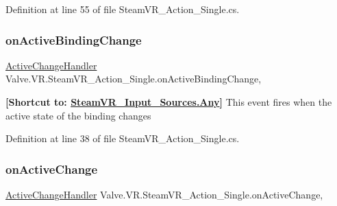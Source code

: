 Definition at line 55 of file Steam\+V\+R\+\_\+\+Action\+\_\+\+Single.\+cs.

\mbox{\label{class_valve_1_1_v_r_1_1_steam_v_r___action___single_ac2174a4a4cf474cb9141e6a6d9709f9c}} 
\subsubsection{\texorpdfstring{onActiveBindingChange}{onActiveBindingChange}}
{\footnotesize\ttfamily \mbox{\hyperlink{class_valve_1_1_v_r_1_1_steam_v_r___action___single_a45ad70dbb8a58191f373b7ae098b833b}{Active\+Change\+Handler}} Valve.\+V\+R.\+Steam\+V\+R\+\_\+\+Action\+\_\+\+Single.\+on\+Active\+Binding\+Change\hspace{0.3cm}{\ttfamily [add]}, {\ttfamily [remove]}}



{\bfseries{\mbox{[}Shortcut to\+: \mbox{\hyperlink{namespace_valve_1_1_v_r_a82e5bf501cc3aa155444ee3f0662853faed36a1ef76a59ee3f15180e0441188ad}{Steam\+V\+R\+\_\+\+Input\+\_\+\+Sources.\+Any}}\mbox{]}}} This event fires when the active state of the binding changes 



Definition at line 38 of file Steam\+V\+R\+\_\+\+Action\+\_\+\+Single.\+cs.

\mbox{\label{class_valve_1_1_v_r_1_1_steam_v_r___action___single_a3067f41e74c07aa2b18fa374290fe78d}} 
\subsubsection{\texorpdfstring{onActiveChange}{onActiveChange}}
{\footnotesize\ttfamily \mbox{\hyperlink{class_valve_1_1_v_r_1_1_steam_v_r___action___single_a45ad70dbb8a58191f373b7ae098b833b}{Active\+Change\+Handler}} Valve.\+V\+R.\+Steam\+V\+R\+\_\+\+Action\+\_\+\+Single.\+on\+Active\+Change\hspace{0.3cm}{\ttfamily [add]}, {\ttfamily [remove]}}



